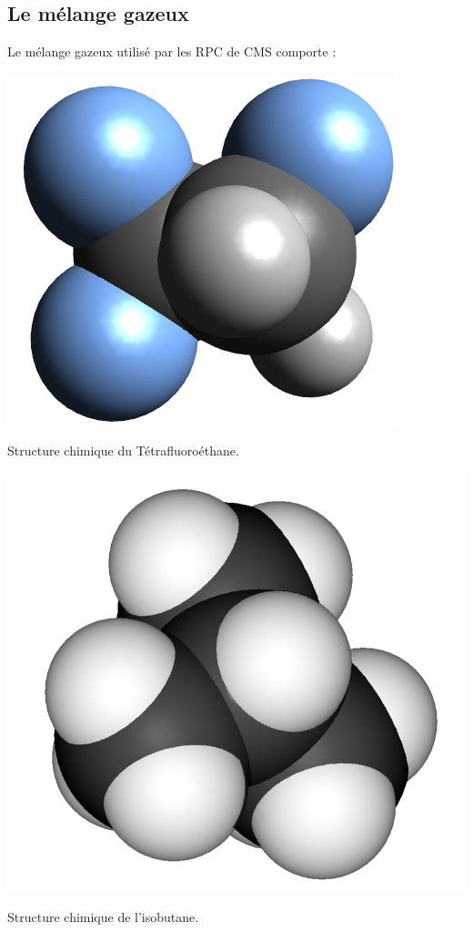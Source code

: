 \subsection{Le mélange gazeux}
Le mélange gazeux utilisé par les RPC de CMS comporte :
\marginpar
{
	\centering
	\includegraphics[width=\marginparwidth]{RPC/C2H2F4.png}
	\captionsetup{type=figure}\caption{Structure chimique du Tétrafluoroéthane.}
	\label{Tetra}
}
\marginpar
{
	\centering
	\includegraphics[width=\marginparwidth]{RPC/Isobutane.png}
	\captionsetup{type=figure}\caption{Structure chimique de l'isobutane.}
	\label{Iso}
}

